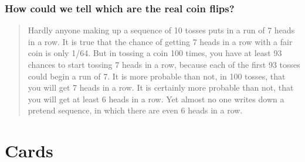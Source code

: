 \documentclass{beamer}
\begin{document}
\begin{frame}
\frametitle{How could we tell which are the real coin flips?}
    \begin{quote}
	Hardly anyone making up a sequence of 10 tosses puts in a run of 7 heads in a row. It is true that 
	the chance of getting 7 heads in a row with a fair coin is only 1/64. But in tossing a coin 100 times, 
	you have at least 93 chances to start tossing 7 heads in a row, because \alert{each of the first 93 
	tosses could begin a run of 7.} It is more probable than not, in 100 tosses, that you will get 7 
	heads in a row. It is certainly more probable than not, that you will get at least 6 heads in a row. 
	Yet almost no one writes down a pretend sequence, in which there are even 6 heads in a row.
	\end{quote}
\end{frame}

\def\eventA{(-0.35,0) circle (1.2)}
\def\eventB{(1.35,0) circle (1.2)}
\def\samplespace{(-2,-2) rectangle (3,2)}
\def\Srect{(-2,-2) rectangle (4,2)}
\def\Arect{(-2,-2) rectangle (0,2)}
\def\Brect{(0,-2) rectangle (2,2)}
\def\Crect{(0,2) rectangle (4,2)}
\def\Devent{(1.6,-0.3) circle (1.3)}
\def\Eevent{(-1,1.2) circle (0.5)}
\def\EventA{(-0.35,0) circle (1.2)}
\def\EventB{(1.35,0) circle (1.2)}
\def\EventC{(-0.35,0) circle (0.6)}
\def\EventD{(0,0) circle (1.6)}
\def\SampleSpace{(-2,-2) rectangle (3,2)}

\section{Cards}
\end{document}

